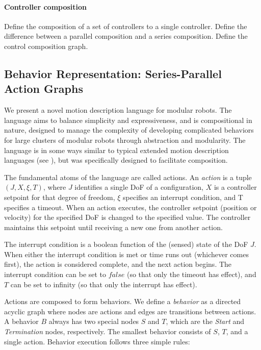 \documentclass[conference]{IEEEtran}
\theoremstyle{definition}
\begin{document}
\paragraph{Controller composition}
Define the composition of a set of controllers to a single controller. Define the difference between a parallel composition and a series composition. Define the control composition graph.

\subsection{Behavior Representation: Series-Parallel Action Graphs}
\label{sec:behavior-representation}
We present a novel motion description language for modular robots.  The
language aims to balance simplicity and expressiveness, and is compositional in
nature, designed to manage the complexity of developing complicated behaviors
for large clusters of modular robots through abstraction and modularity. The language
is in some ways similar to typical extended motion description languages (see \cite{hristu2003motion}),
but was specifically designed to facilitate  composition.
 
The fundamental atoms of the language are called actions.  An \textit{action} is a tuple \(
(J, X, \xi, T)\), where \(J\) identifies a single DoF of a configuration, \(X\) is a
controller setpoint for that degree of freedom, \(\xi\) specifies an interrupt
condition, and T specifies a timeout. When an action executes, the controller
setpoint (position or velocity) for the specified DoF is changed to the specified
value. The controller maintains this setpoint until receiving a new one from another
action. 

The interrupt condition is a boolean function of the (sensed) state of the DoF \(J\).
When either the interrupt condition is met or time runs out (whichever comes
first), the action is considered complete, and the next action  begins. The
interrupt condition can be set to \(false\) (so that only the timeout has effect),
and \(T\) can be set to infinity (so that only the interrupt has effect).

Actions are composed to form behaviors. We define a \textit{behavior} as a directed acyclic graph where nodes are
actions and edges are transitions between actions.  A behavior \(B\) always has
two special nodes \(S\) and \(T\), which are the \textit{Start} and
\textit{Termination} nodes, respectively.  The smallest behavior consists of
\(S\), \(T\), and a single action.  Behavior execution follows three simple
rules:
\end{document}
